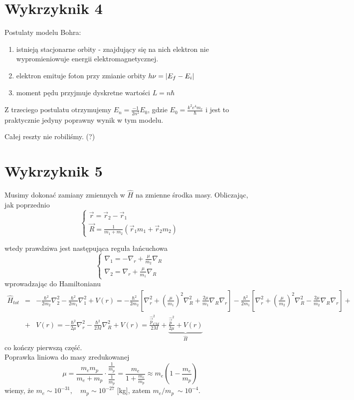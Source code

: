 \documentclass[a4paper,12pt]{article}
\begin{document}
\section{Wykrzyknik 4}
Postulaty modelu Bohra:
\begin{enumerate}
  \item istnieją stacjonarne orbity - znajdujący się na nich elektron nie
    wypromieniowuje energii elektromagnetycznej.
  \item elektron emituje foton przy zmianie orbity $h\nu= \abs*{E_f - E_i}$
  \item moment pędu przyjmuje dyskretne wartości $ L = n\hbar$
\end{enumerate}
Z trzeciego postulatu otrzymujemy $E_n = \frac{-1}{2n^2}E_0$, gdzie $E_0 =
\frac{k^2 e^4 m_e}{\hbar}$
i jest to praktycznie jedyny poprawny wynik w tym modelu. 

Całej reszty nie robiliśmy. (?)


\section{Wykrzyknik 5}
		Musimy dokonać zamiany zmiennych w $\hat{H}$ na zmienne środka masy. Obliczając, jak poprzednio
		$$
		\left\{
			\begin{array}{l}
				\vec{r} = \vec{r}_2-\vec{r}_1\\
				\vec{R} = \frac{1}{m_1 + m_2}\left(\vec{r}_1 m_1 + \vec{r}_2 m_2\right)
			\end{array}
		\right.
	$$

		wtedy prawdziwa jest następująca reguła łańcuchowa 
		$$
		\left\{
			\begin{array}{l}
				\nabla_1 = -\nabla_r + \frac{\mu}{m_2}\nabla_R \\
				\nabla_2 = \nabla_r + \frac{\mu}{m_1}\nabla_R 
			\end{array}
		\right.
		$$
		wprowadzając do Hamiltonianu
		$$
		\begin{array}{lll}
			\hat{H}_{tot} &=& -\frac{\hbar^2}{2m_2}\nabla_2^2 - \frac{\hbar^2}{2m_1}\nabla_1^2 + V(r) = -\frac{\hbar^2}{2m_2}\left[\nabla_r^2+\left(\frac{\mu}{m_1}\right)^2\nabla_R^2
			+\frac{2\mu}{m_1}\nabla_R\nabla_r \right] -\frac{\hbar^2}{2m_1}\left[\nabla_r^2+\left(\frac{\mu}{m_2}\right)^2\nabla_R^2
			-\frac{2\mu}{m_2}\nabla_R\nabla_r \right] + \\
			&+& V(r) = -\frac{\hbar^2}{2\mu}\nabla_r^2-\frac{\hbar^2}{2M}\nabla_R^2 + V(r) = \frac{\hat{\vec{p}}_{CM}^2}{2M} + \underbrace{\frac{\hat{\vec{p}}^2}{2\mu} +  V(r)}_{\hat{H}}
		\end{array}
		$$
		co kończy pierwszą część.\\
		Poprawka liniowa do masy zredukowanej
		$$
			\mu = \frac{m_em_p}{m_e+m_p} \cdot \frac{\frac{1}{m_p}}{\frac{1}{m_p}} = \frac{m_e}{1+\frac{m_e}{m_p}} \approx m_e \left(1-\frac{m_e}{m_p}\right)
		$$
		wiemy, że $m_e \sim 10^{-31},\quad m_p \sim 10^{-27}$ [kg], zatem $m_e/m_p ~\sim 10^{-4}$.
\end{document}

